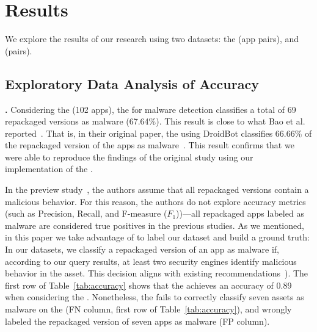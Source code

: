 \section{Results}\label{sec:results}


 We explore
the results of our research using two datasets: the \sds (\appsSmall app pairs), and \cds (\apps pairs).


\subsection{Exploratory Data Analysis of Accuracy}\label{sec:accuracy}


{\bf \sds.} Considering the \sds (102 apps), the \mas for malware detection 
classifies a total of 69 repackaged versions as malware (67.64\%).
This result is close to what Bao et al. reported~\cite{DBLP:conf/wcre/BaoLL18}.
That is, in their original paper,  the \mas using DroidBot classifies 66.66\% of the
repackaged version of the apps as malware~\cite{DBLP:conf/wcre/BaoLL18}.
This result confirms that we were able to reproduce the findings of the original study using our
implementation of the \mas. 


In the preview study~\cite{DBLP:conf/wcre/BaoLL18},
the authors assume that all repackaged versions contain a
malicious behavior. For this reason, the authors do not
explore accuracy metrics (such as Precision, Recall, and
F-measure ($F_1$))---all repackaged apps labeled as
malware are considered true positives in the previous studies.
As we mentioned, in this paper we take advantage
of \vt to label our dataset and build a ground truth:
In our datasets, we classify a repackaged version of an app as malware if, according to our \vt
query results, at least two security engines identify malicious behavior in the asset.
This decision aligns with existing recommendations~\cite{DBLP:conf/uss/ZhuSYQZS020,DBLP:journals/ese/KhanmohammadiEH19}).
The first row of Table~\ref{tab:accuracy} shows that the \mas achieves an accuracy of 0.89 when
considering the \sds. Nonetheless, the \mas fails
to correctly classify seven assets as malware on the \sds (FN column, first row of Table~\ref{tab:accuracy}),
and wrongly labeled the repackaged version of seven apps as malware (FP column).


